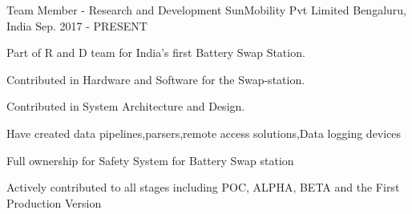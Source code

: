 

\begin{cventries}

  \cventry
    {Team Member - Research and Development} %
    {SunMobility Pvt Limited} %
    {Bengaluru, India} %
    {Sep. 2017 - PRESENT} %
    {
      \begin{cvitems} %
        \item {Part of R and D team for India's first Battery Swap Station.}
        \item {Contributed in Hardware and Software for the Swap-station.}
        \item {Contributed in System Architecture and Design.}
        \item {Have created data pipelines,parsers,remote access solutions,Data logging devices}
        \item {Full ownership for Safety System for Battery Swap station}
        \item {Actively contributed to all stages including POC, ALPHA, BETA and the First Production Version}
      \end{cvitems}
    }

\end{cventries}
